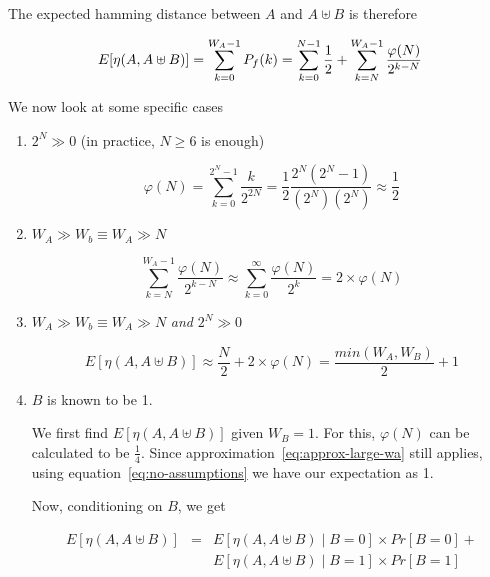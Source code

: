The expected hamming distance between $A$ and $A \uplus B$ is therefore

\begin{equation}
  \label{eq:no-assumptions}
  E[\eta(A, A \uplus B)]
  = \displaystyle\sum\limits_{k=0}^{W_A - 1} P_f(k) \\
  = \displaystyle\sum\limits_{k=0}^{N - 1} \frac{1}{2} + 
  \displaystyle\sum\limits_{k=N}^{W_A - 1} \frac{\varphi(N)}{2^{k - N}}
\end{equation}

We now look at some specific cases

\begin{enumerate}
  \item $2^N \gg 0$ (in practice, $N \geq 6$ is enough)

    \begin{equation}
      \varphi(N) = \displaystyle\sum\limits_{k=0}^{2^{N} - 1} \frac{k}{2^{2 N}} = 
      \frac{1}{2} \frac{2^N (2^N - 1)}{(2^N) (2^N)}
      \approx \frac{1}{2}
    \end{equation}

  \item $W_A \gg W_b \equiv W_A \gg N$

    \begin{equation}
      \label{eq:approx-large-wa}
      \displaystyle\sum\limits_{k=N}^{W_A - 1} \frac{\varphi(N)}{2^{k - N}} \approx
      \displaystyle\sum\limits_{k=0}^{\infty} \frac{\varphi(N)}{2^k} = 2 \times \varphi(N)
    \end{equation}

  \item $W_A \gg W_b \equiv W_A \gg N$ \textit{and} $2^N \gg 0$

    \begin{equation}
      E[\eta(A, A \uplus B)] \approx \frac{N}{2} + 2 \times \varphi(N) = 
      \frac{min(W_A, W_B)}{2} + 1
    \end{equation}

  \item $B$ is known to be 1.

    We first find $E[\eta(A, A \uplus B)]$ given $W_B = 1$.  For this,
    $\varphi(N)$ can be calculated to be $\frac{1}{4}$.  Since
    approximation~\ref{eq:approx-large-wa} still applies, using
    equation~\ref{eq:no-assumptions} we have our expectation as 1.

    Now, conditioning on $B$, we get

    \begin{eqnarray*}
      E[\eta(A, A \uplus B)] & = & E[\eta(A, A \uplus B) \mid B = 0]
      \times Pr[B = 0] + \\
      && E[\eta(A, A \uplus B) \mid B = 1] \times Pr[B
        = 1]
    \end{eqnarray*}


\end{enumerate}

